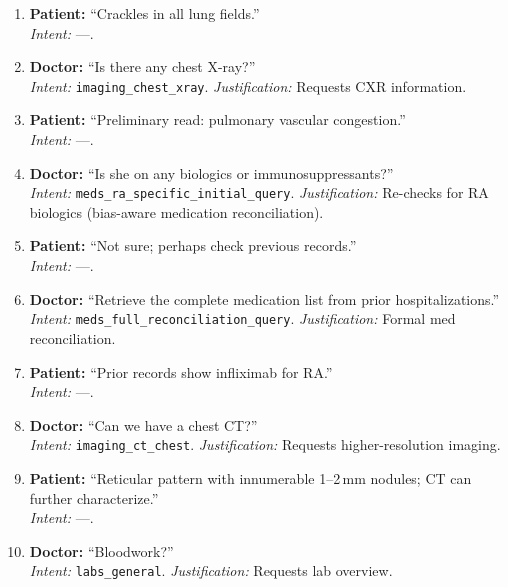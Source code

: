 \begin{enumerate}
  \item \textbf{Patient:} ``Crackles in all lung fields.'' \\
  \emph{Intent:} ---.

  \item \textbf{Doctor:} ``Is there any chest X-ray?'' \\
  \emph{Intent:} \texttt{imaging\_chest\_xray}. \emph{Justification:} Requests CXR information.

  \item \textbf{Patient:} ``Preliminary read: pulmonary vascular congestion.'' \\
  \emph{Intent:} ---.

  \item \textbf{Doctor:} ``Is she on any biologics or immunosuppressants?'' \\
  \emph{Intent:} \texttt{meds\_ra\_specific\_initial\_query}. \emph{Justification:} Re-checks for RA biologics (bias-aware medication reconciliation).

  \item \textbf{Patient:} ``Not sure; perhaps check previous records.'' \\
  \emph{Intent:} ---.

  \item \textbf{Doctor:} ``Retrieve the complete medication list from prior hospitalizations.'' \\
  \emph{Intent:} \texttt{meds\_full\_reconciliation\_query}. \emph{Justification:} Formal med reconciliation.

  \item \textbf{Patient:} ``Prior records show infliximab for RA.'' \\
  \emph{Intent:} ---.

  \item \textbf{Doctor:} ``Can we have a chest CT?'' \\
  \emph{Intent:} \texttt{imaging\_ct\_chest}. \emph{Justification:} Requests higher-resolution imaging.

  \item \textbf{Patient:} ``Reticular pattern with innumerable 1--2\,mm nodules; CT can further characterize.'' \\
  \emph{Intent:} ---.

  \item \textbf{Doctor:} ``Bloodwork?'' \\
  \emph{Intent:} \texttt{labs\_general}. \emph{Justification:} Requests lab overview.


\end{enumerate}
